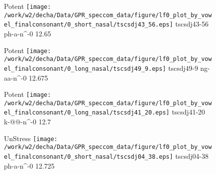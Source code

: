 \documentclass{article}
\begin{document}
\begin{figure}[t]
\begin{minipage}[b]{.24\textwidth}
\colorbox{Apricot}{Potent}
\centering
\texttt{[image: /work/w2/decha/Data/GPR\_speccom\_data/figure/lf0\_plot\_by\_vowel\_finalconsonant/0\_short\_nasal/tscsdj43\_56.eps]}
tscsdj43-56 ph-a-n\textasciicircum-0 12.65
\end{minipage}
\begin{minipage}[b]{.24\textwidth}
\colorbox{Apricot}{Potent}
\centering
\texttt{[image: /work/w2/decha/Data/GPR\_speccom\_data/figure/lf0\_plot\_by\_vowel\_finalconsonant/0\_long\_nasal/tscsdj49\_9.eps]}
tscsdj49-9 ng-aa-n\textasciicircum-0 12.675
\end{minipage}
\begin{minipage}[b]{.24\textwidth}
\colorbox{Apricot}{Potent}
\centering
\texttt{[image: /work/w2/decha/Data/GPR\_speccom\_data/figure/lf0\_plot\_by\_vowel\_finalconsonant/0\_long\_nasal/tscsdj41\_20.eps]}
tscsdj41-20 k-@@-n\textasciicircum-0 12.7
\end{minipage}
\begin{minipage}[b]{.24\textwidth}
UnStress
\centering
\texttt{[image: /work/w2/decha/Data/GPR\_speccom\_data/figure/lf0\_plot\_by\_vowel\_finalconsonant/0\_short\_nasal/tscsdj04\_38.eps]}
tscsdj04-38 ph-a-n\textasciicircum-0 12.725
\end{minipage}
\end{figure}
\end{document}
